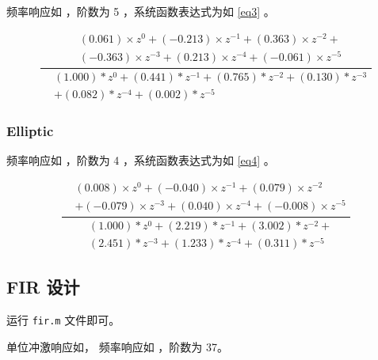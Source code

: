\documentclass[lang=cn,11pt,a4paper,cite=authoryear]{elegantpaper}
\begin{document}
频率响应如  ，阶数为 5 ，系统函数表达式为如 \eqref{eq3} 。


\begin{equation}\label{eq3}
    \dfrac{\begin{aligned}
        &(0.061) \times z^{0} + (-0.213) \times z^{-1} + (0.363) \times z^{-2} + \\
        &(-0.363) \times z^{-3} + (0.213) \times z^{-4} + (-0.061) \times z^{-5} 
    \end{aligned}}{\begin{aligned}
        &(1.000) * z^{0} + (0.441) * z^{-1} + (0.765) * z^{-2} + (0.130) * z^{-3} \\
        &+ (0.082) * z^{-4} + (0.002) * z^{-5}
    \end{aligned} }
\end{equation}


\subsubsection{Elliptic}

频率响应如  ，阶数为 4 ，系统函数表达式为如 \eqref{eq4} 。


\begin{equation}\label{eq4}
\dfrac{\begin{aligned}
    &(0.008) \times z^{0} + (-0.040) \times z^{-1} + (0.079) \times z^{-2} \\
    &+ (-0.079) \times z^{-3} + (0.040) \times z^{-4} + (-0.008) \times z^{-5} 
\end{aligned}}{\begin{aligned}
    & (1.000) * z^{0} + (2.219) * z^{-1} + (3.002) * z^{-2} + \\
    &  (2.451) * z^{-3} + (1.233) * z^{-4} + (0.311) * z^{-5} 
\end{aligned}}
\end{equation}


\subsection{FIR 设计}

运行 \lstinline{fir.m} 文件即可。

单位冲激响应如， 频率响应如 ，阶数为 37。


\end{document}
